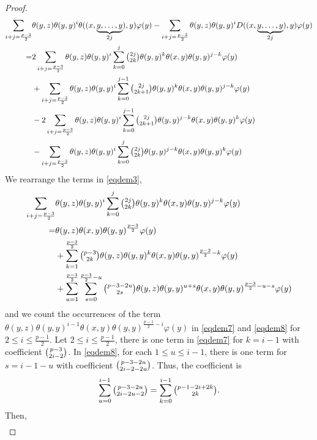 \documentclass[11pt, twoside]{article}
\begin{document}
\begin{proof}
\begin{align}
        \sum\limits_{i+j=\frac{p-3}{2}}&\theta(y,z)\theta(y,y)^i\theta((x,\underbrace{y,\ldots,y}_{2j}),y)\varphi(y) \notag - \sum\limits_{i+j=\frac{p-3}{2}}\theta(y,z)\theta(y,y)^iD((x,\underbrace{y,\ldots,y}_{2j}),y)\varphi(y) \notag\\ =& 2\sum\limits_{i+j=\frac{p-3}{2}}\theta(y,z)\theta(y,y)^i\sum\limits_{k=0}^j\tbinom{2j}{2k}\theta(y,y)^k\theta(x,y)\theta(y,y)^{j-k}\varphi(y)\label{eqdem3} \\& + \sum\limits_{i+j=\frac{p-3}{2}}\theta(y,z)\theta(y,y)^i\sum\limits_{k=0}^{j-1}\tbinom{2j}{2k+1}\theta(y,y)^k\theta(x,y)\theta(y,y)^{j-k}\varphi(y)\label{eqdem4} \\ &-2 \sum\limits_{i+j=\frac{p-3}{2}}\theta(y,z)\theta(y,y)^i\sum\limits_{k=0}^{j-1}\tbinom{2j}{2k+1}\theta(y,y)^{j-k}\theta(x,y)\theta(y,y)^{k}\varphi(y)\label{eqdem5} \\ & -\sum\limits_{i+j=\frac{p-3}{2}}\theta(y,z)\theta(y,y)^i\sum\limits_{k=0}^j\tbinom{2j}{2k}\theta(y,y)^{j-k}\theta(x,y)\theta(y,y)^{k}\varphi(y)\label{eqdem6}
    \end{align} We rearrange the terms in \eqref{eqdem3}, \begin{align}
        \sum\limits_{i+j=\frac{p-3}{2}}&\theta(y,z)\theta(y,y)^i\sum\limits_{k=0}^j\tbinom{2j}{2k}\theta(y,y)^k\theta(x,y)\theta(y,y)^{j-k}\varphi(y)\notag\\ =& \theta(y,z)\theta(x,y)\theta(y,y)^\frac{p-3}{2}\varphi(y)\notag\\ &+ \sum\limits_{k=1}^\frac{p-3}{2}\tbinom{p-3}{2k}\theta(y,z)\theta(y,y)^k\theta(x,y)\theta(y,y)^{\frac{p-3}{2}-k}\varphi(y) \label{eqdem7}\\ &+ \sum\limits_{u=1}^\frac{p-3}{2}\sum\limits_{s=0}^{\frac{p-3}{2}-u}\tbinom{p-3-2u}{2s}\theta(y,z)\theta(y,y)^{u+s}\theta(x,y)\theta(y,y)^{\frac{p-3}{2}-u-s}\varphi(y)\label{eqdem8}
    \end{align} and we count the occurrences of the term $\theta(y,z)\theta(y,y)^{i-1}\theta(x,y)\theta(y,y)^{\frac{p-1}{2}-i}\varphi(y) $ in \eqref{eqdem7} and \eqref{eqdem8} for $2\leq i\leq \frac{p-1}{2} $. Let $2\leq i\leq \frac{p-1}{2}$, there is one term in \eqref{eqdem7} for $k=i-1$ with coefficient $\tbinom{p-3}{2i-2} $. In \eqref{eqdem8}, for each $1\leq u\leq i-1$, there is one term for $s=i-1-u$ with coefficient $\tbinom{p-3-2u}{2i-2-2u} $. Thus, the coefficient is \begin{align*}
        \sum\limits_{u=0}^{i-1}\tbinom{p-3-2u}{2i-2u-2}= \sum\limits_{k=0}^{i-1}\tbinom{p-1-2i+2k}{2k}.
    \end{align*} Then, \begin{align*}

\end{align*}
\end{proof}
\end{document}
